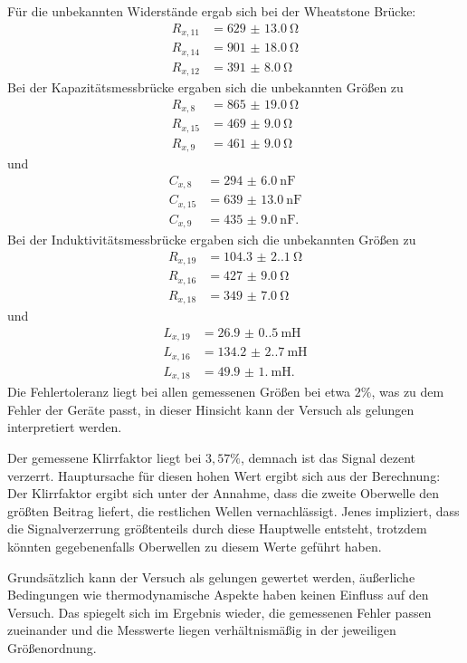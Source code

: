 \noindent Für die unbekannten Widerstände ergab sich bei der Wheatstone Brücke:
\begin{align*}
    R_{x,11} &= \qty{629(13.0)}{\ohm}\\
    R_{x,14} &= \qty{901(18.0)}{\ohm}\\
    R_{x,12} &= \qty{391(8.0)}{\ohm}
\end{align*}
Bei der Kapazitätsmessbrücke ergaben sich die unbekannten Größen zu
\begin{align*}
    R_{x,8}  &= \qty{865(19.0)}{\ohm}\\
    R_{x,15} &= \qty{469(9.0)}{\ohm}\\
    R_{x,9}  &= \qty{461(9.0)}{\ohm}
\end{align*}
und
\begin{align*}
    C_{x,8}  &= \qty{294(6.0)}{\nano\farad}\\
    C_{x,15} &= \qty{639(13.0)}{\nano\farad}\\
    C_{x,9}  &= \qty{435(9.0)}{\nano\farad}.
\end{align*}
Bei der Induktivitätsmessbrücke ergaben sich die unbekannten Größen zu 
\begin{align*}
    R_{x,19} &= \qty{104.3(2.1)}{\ohm}\\
    R_{x,16} &= \qty{427(9.0)}{\ohm}\\
    R_{x,18} &= \qty{349(7.0)}{\ohm}
\end{align*}
und
\begin{align*}
    L_{x,19} &= \qty{26.9(0.5)}{\milli\henry}\\
    L_{x,16} &= \qty{134.2(2.7)}{\milli\henry}\\
    L_{x,18} &= \qty{49.9(1.0)}{\milli\henry}.
\end{align*}
Die Fehlertoleranz liegt bei allen gemessenen Größen bei etwa $2 \%$, was zu 
dem Fehler der Geräte passt, in dieser Hinsicht kann der Versuch als gelungen 
interpretiert werden.
\par\vspace{0.5em}
\noindent Der gemessene Klirrfaktor liegt bei $3,57 \%$, demnach ist das Signal
dezent verzerrt. Hauptursache für diesen hohen Wert ergibt sich aus der Berechnung: 
Der Klirrfaktor ergibt sich unter der Annahme, dass die zweite Oberwelle den 
größten Beitrag liefert, die restlichen Wellen vernachlässigt. Jenes impliziert, 
dass die Signalverzerrung größtenteils durch diese Hauptwelle entsteht, trotzdem 
könnten gegebenenfalls Oberwellen zu diesem Werte geführt haben.
\par\vspace{0.5em}
\noindent Grundsätzlich kann der Versuch als gelungen gewertet werden, äußerliche 
Bedingungen wie thermodynamische Aspekte haben keinen Einfluss auf den Versuch.
Das spiegelt sich im Ergebnis wieder, die gemessenen Fehler passen zueinander 
und die Messwerte liegen verhältnismäßig in der jeweiligen Größenordnung.